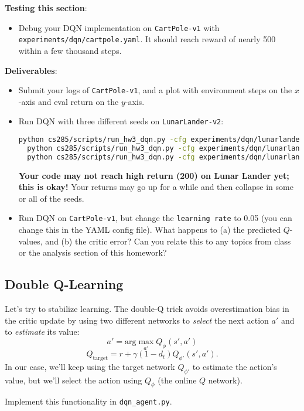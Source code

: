 \textbf{Testing this section}:
\begin{itemize}
    \item Debug your DQN implementation on \verb|CartPole-v1| with \verb|experiments/dqn/cartpole.yaml|. It should reach reward of nearly 500 within a few thousand steps.
\end{itemize}

\textbf{Deliverables}:
\begin{itemize}
    \item Submit your logs of \verb|CartPole-v1|, and a plot with environment steps on the $x$-axis and eval return on the $y$-axis.
    \item Run DQN with three different seeds on \verb|LunarLander-v2|:
\begin{lstlisting}[language=bash,breaklines=true]
  python cs285/scripts/run_hw3_dqn.py -cfg experiments/dqn/lunarlander.yaml --seed 1
  python cs285/scripts/run_hw3_dqn.py -cfg experiments/dqn/lunarlander.yaml --seed 2
  python cs285/scripts/run_hw3_dqn.py -cfg experiments/dqn/lunarlander.yaml --seed 3
\end{lstlisting}
\textbf{Your code may not reach high return (200) on Lunar Lander yet; this is okay!} Your returns may go up for a while and then collapse in some or all of the seeds.
    \item Run DQN on \verb|CartPole-v1|, but change the \verb|learning rate| to 0.05 (you can change this in the YAML config file). What happens to (a) the predicted $Q$-values, and (b) the critic error? Can you relate this to any topics from class or the analysis section of this homework?
\end{itemize}

\subsection{Double Q-Learning}
Let's try to stabilize learning. The double-Q trick avoids overestimation bias in the critic update by using two different networks to \textit{select} the next action $a'$ and to \textit{estimate} its value:
\[a' = \textrm{arg}\max_{a'} Q_{\phi}(s', a')\]
\[Q_{\textrm{target}} = r + \gamma(1-d_t) Q_{\phi'}(s', a').\]
In our case, we'll keep using the target network $Q_{\phi'}$ to estimate the action's value, but we'll select the action using $Q_{\phi}$ (the online $Q$ network).

Implement this functionality in \verb|dqn_agent.py|.

